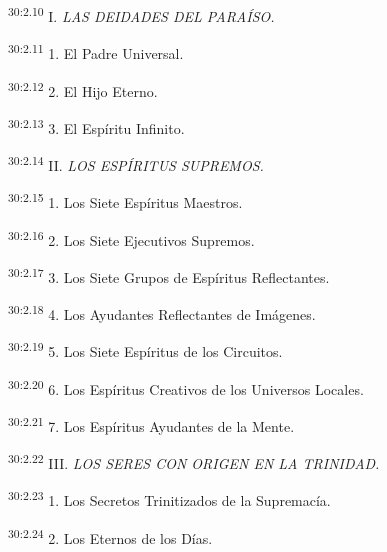 \par
\textsuperscript{30:2.10} I. \textit{LAS DEIDADES DEL PARAÍSO.}

\par
\textsuperscript{30:2.11} 1. El Padre Universal.

\par
\textsuperscript{30:2.12} 2. El Hijo Eterno.

\par
\textsuperscript{30:2.13} 3. El Espíritu Infinito.

\par
\textsuperscript{30:2.14} II. \textit{LOS ESPÍRITUS SUPREMOS.}

\par
\textsuperscript{30:2.15} 1. Los Siete Espíritus Maestros.

\par
\textsuperscript{30:2.16} 2. Los Siete Ejecutivos Supremos.

\par
\textsuperscript{30:2.17} 3. Los Siete Grupos de Espíritus Reflectantes.

\par
\textsuperscript{30:2.18} 4. Los Ayudantes Reflectantes de Imágenes.

\par
\textsuperscript{30:2.19} 5. Los Siete Espíritus de los Circuitos.

\par
\textsuperscript{30:2.20} 6. Los Espíritus Creativos de los Universos Locales.

\par
\textsuperscript{30:2.21} 7. Los Espíritus Ayudantes de la Mente.

\par
\textsuperscript{30:2.22} III. \textit{LOS SERES CON ORIGEN EN LA TRINIDAD.}

\par
\textsuperscript{30:2.23} 1. Los Secretos Trinitizados de la Supremacía.

\par
\textsuperscript{30:2.24} 2. Los Eternos de los Días.

